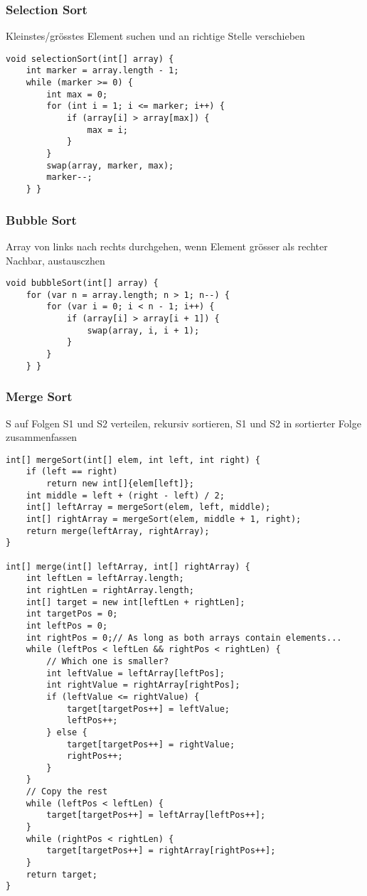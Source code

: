 \begin{multicols*}{4}
		\subsubsection{Selection Sort}
		Kleinstes/grösstes Element suchen und an richtige Stelle verschieben
		
			\begin{lstlisting}
void selectionSort(int[] array) {
	int marker = array.length - 1;
	while (marker >= 0) {
		int max = 0;
		for (int i = 1; i <= marker; i++) {
			if (array[i] > array[max]) {
				max = i;
			}
		}
		swap(array, marker, max);
		marker--;
	} }
			\end{lstlisting}
		
		\subsubsection{Bubble Sort}
		Array von links nach rechts durchgehen, wenn Element grösser als rechter Nachbar, austausczhen
			\begin{lstlisting}
void bubbleSort(int[] array) {
	for (var n = array.length; n > 1; n--) {
		for (var i = 0; i < n - 1; i++) {
			if (array[i] > array[i + 1]) {
				swap(array, i, i + 1);
			}
		}
	} }
			\end{lstlisting}
		
		\subsubsection{Merge Sort}
		S auf Folgen S1 und S2 verteilen, rekursiv sortieren, S1 und S2 in sortierter Folge zusammenfassen
			\begin{lstlisting}
int[] mergeSort(int[] elem, int left, int right) {
	if (left == right)
	  	return new int[]{elem[left]};
	int middle = left + (right - left) / 2;
	int[] leftArray = mergeSort(elem, left, middle);
	int[] rightArray = mergeSort(elem, middle + 1, right);
	return merge(leftArray, rightArray);
}

int[] merge(int[] leftArray, int[] rightArray) {
	int leftLen = leftArray.length;
	int rightLen = rightArray.length;
	int[] target = new int[leftLen + rightLen];
	int targetPos = 0;
	int leftPos = 0;
	int rightPos = 0;// As long as both arrays contain elements...
	while (leftPos < leftLen && rightPos < rightLen) {
		// Which one is smaller?
		int leftValue = leftArray[leftPos];
		int rightValue = rightArray[rightPos];
		if (leftValue <= rightValue) {
			target[targetPos++] = leftValue;
			leftPos++;
		} else {
			target[targetPos++] = rightValue;
			rightPos++;
		}
	}
    // Copy the rest
	while (leftPos < leftLen) {
		target[targetPos++] = leftArray[leftPos++];
	}
	while (rightPos < rightLen) {
		target[targetPos++] = rightArray[rightPos++];
	}
	return target;
}
			\end{lstlisting}
		

\end{multicols*}

